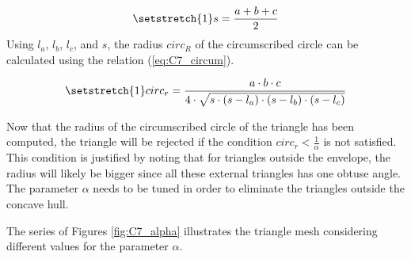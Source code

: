 \begin{equation}
    \setstretch{1}
    s = \frac{a + b + c}{2}\label{eq:C7_semiperim}
\end{equation}
Using $l_a$, $l_b$, $l_c$, and $s$, the radius $circ_R$ of the circumscribed circle can be calculated using the relation (\ref{eq:C7_circum}). 

\begin{equation}
    \setstretch{1}
   circ_r = \frac{a\cdot b\cdot c}{4\cdot \sqrt{s\cdot (s - l_a)\cdot (s - l_b)\cdot (s - l_c)}}\label{eq:C7_circum}
\end{equation}

Now that the radius of the circumscribed circle of the triangle has been computed, the triangle will be rejected if the condition $circ_r <\frac{1}{\alpha}$ is not satisfied. This condition is justified by noting that for triangles outside the envelope, the radius will likely be bigger since all these external triangles has one obtuse angle. The parameter $\alpha$ needs to be tuned in order to eliminate the triangles outside the concave hull. 

The series of Figures \ref{fig:C7_alpha} illustrates the triangle mesh considering different values for the parameter $\alpha$.

